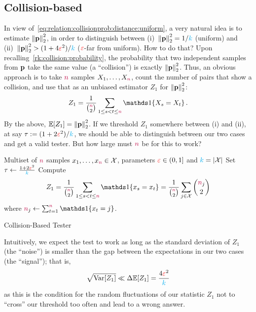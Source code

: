 \subsection{Collision-based} In view of~\cref{eq:relation:collisionprob:distance:uniform}, a very natural idea is to estimate $\normtwo{\p}^2$, in order to distinguish between (i)~$\normtwo{\p}^2 = 1/\ab$ (uniform) and (ii)~$\normtwo{\p}^2 > (1+4\dst^2)/\ab$ ($\textcolor{red}{\varepsilon}$-far from uniform). How to do that? Upon recalling~\cref{rk:collision:probability}, the probability that two independent samples from $\mathbf{p}$ take the same value (a ``collision'') is exactly $\normtwo{\p}^2$. Thus, 
an obvious approach is to take ${\textcolor{purple}{n}}$ samples $X_1,\dots,X_{\textcolor{purple}{n}}$, count the number of pairs that show a collision, and use that as an unbiased estimator $Z_1$ for $\normtwo{\p}^2$:
\begin{equation}
  \label{eq:def:z1}
    Z_1 = \frac{1}{\binom{\ns}{2}} \sum_{1\leq s < t \leq \ns} \indic{X_s=X_t}\,.
\end{equation}
By the above, $\expect{Z_1} = \normtwo{\p}^2$. If we threshold $Z_1$ somewhere between (i) and (ii), at say $\tau:= (1+2\textcolor{red}{\varepsilon}^2)/{\textcolor{cyan}{k}}$, we should be able to distinguish between our two cases and get a valid tester. But how large must ${\textcolor{purple}{n}}$ be for this to work? 

\begin{algorithm}[ht!]
  \begin{algorithmic}[1]
    \Require Multiset of ${\textcolor{purple}{n}}$ samples $x_1,\dots,x_{\textcolor{purple}{n}} \in \mathcal{X}$, parameters $\textcolor{red}{\varepsilon}\in(0,1]$ and $\ab = \abs{\domain}$
    \State Set $\tau \gets \frac{1+2\textcolor{red}{\varepsilon}^2}{{\textcolor{cyan}{k}}}$
    \State Compute 
    \[
        Z_1 = \frac{1}{\binom{\ns}{2}} \sum_{1\leq s < t \leq \ns} \indic{x_s=x_t} = \frac{1}{\binom{\ns}{2}} \sum_{j\in\domain} \binom{\ns_j}{2}
    \] where $\ns_j \gets \sum_{t=1}^\ns\indic{x_t=j}$.
     \Return \reject {}
    \Else\ 
      \Return \accept {}
    \EndIf
  \end{algorithmic}
  \caption{\label{algo:collision-based}\sc Collision-Based Tester}
\end{algorithm}

Intuitively, we expect the test to work as long as the standard deviation of $Z_1$ (the ``noise'') is smaller than the gap between the expectations in our two cases (the ``signal''); that is,
\begin{equation}
  \label{eq:signal:to:noise}
      \sqrt{\Var[Z_1]} \ll \Delta \expect{Z_1} = \frac{4\dst^2}{\ab}
\end{equation}
as this is the condition for the random fluctuations of our statistic $Z_1$ not to ``cross'' our threshold too often and lead to a wrong answer.

